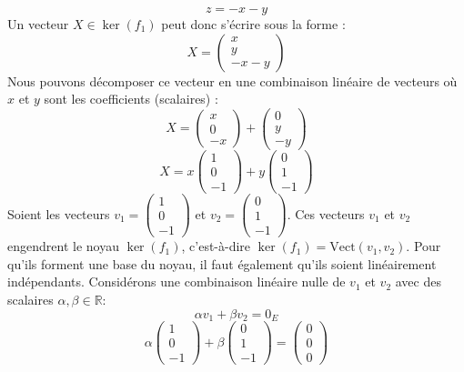 \documentclass{report}
\begin{document}
$$ z = -x - y $$
Un vecteur $X \in \ker(f_1)$ peut donc s'écrire sous la forme :
$$ X = \begin{pmatrix} x \\ y \\ -x-y \end{pmatrix} $$
Nous pouvons décomposer ce vecteur en une combinaison linéaire de vecteurs où $x$ et $y$ sont les coefficients (scalaires) :
$$ X = \begin{pmatrix} x \\ 0 \\ -x \end{pmatrix} + \begin{pmatrix} 0 \\ y \\ -y \end{pmatrix} $$
$$ X = x \begin{pmatrix} 1 \\ 0 \\ -1 \end{pmatrix} + y \begin{pmatrix} 0 \\ 1 \\ -1 \end{pmatrix} $$
Soient les vecteurs $v_1 = \begin{pmatrix} 1 \\ 0 \\ -1 \end{pmatrix}$ et $v_2 = \begin{pmatrix} 0 \\ 1 \\ -1 \end{pmatrix}$.
Ces vecteurs $v_1$ et $v_2$ engendrent le noyau $\ker(f_1)$, c'est-à-dire $\ker(f_1) = \text{Vect}(v_1, v_2)$.
Pour qu'ils forment une base du noyau, il faut également qu'ils soient linéairement indépendants.
Considérons une combinaison linéaire nulle de $v_1$ et $v_2$ avec des scalaires $\alpha, \beta \in \mathbb{R}$:
$$ \alpha v_1 + \beta v_2 = 0_E $$
$$ \alpha \begin{pmatrix} 1 \\ 0 \\ -1 \end{pmatrix} + \beta \begin{pmatrix} 0 \\ 1 \\ -1 \end{pmatrix} = \begin{pmatrix} 0 \\ 0 \\ 0 \end{pmatrix} $$
\end{document}
